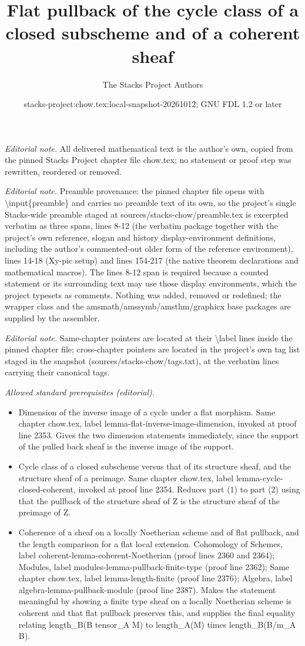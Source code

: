 \documentclass[10pt,a4paper]{amsart}
\title{Flat pullback of the cycle class of a closed subscheme and of a coherent sheaf}
\author{The Stacks Project Authors}
\date{stacks-project:chow.tex:local-snapshot-20261012; GNU FDL 1.2 or later}
\theoremstyle{plain}
\theoremstyle{definition}
\theoremstyle{remark}
\numberwithin{equation}{subsection}
\begin{document}
\maketitle
\noindent\textit{Editorial note.} All delivered mathematical text is the author's own, copied from the pinned Stacks Project chapter file chow.tex; no statement or proof step was rewritten, reordered or removed.\par\medskip
\noindent\textit{Editorial note.} Preamble provenance: the pinned chapter file opens with \textbackslash{}input\{preamble\} and carries no preamble text of its own, so the project's single Stacks-wide preamble staged at sources/stacks-chow/preamble.tex is excerpted verbatim as three spans, lines 8-12 (the verbatim package together with the project's own reference, slogan and history display-environment definitions, including the author's commented-out older form of the reference environment), lines 14-18 (Xy-pic setup) and lines 154-217 (the native theorem declarations and mathematical macros). The lines 8-12 span is required because a counted statement or its surrounding text may use those display environments, which the project typesets as comments. Nothing was added, removed or redefined; the wrapper class and the amsmath/amssymb/amsthm/graphicx base packages are supplied by the assembler.\par\medskip
\noindent\textit{Editorial note.} Same-chapter pointers are located at their \textbackslash{}label lines inside the pinned chapter file; cross-chapter pointers are located in the project's own tag list staged in the snapshot (sources/stacks-chow/tags.txt), at the verbatim lines carrying their canonical tags.\par\medskip
\noindent\textit{Allowed standard prerequisites (editorial).}\begin{itemize}
\item Dimension of the inverse image of a cycle under a flat morphism. Same chapter chow.tex, label lemma-flat-inverse-image-dimension, invoked at proof line 2353. Gives the two dimension statements immediately, since the support of the pulled back sheaf is the inverse image of the support.
\item Cycle class of a closed subscheme versus that of its structure sheaf, and the structure sheaf of a preimage. Same chapter chow.tex, label lemma-cycle-closed-coherent, invoked at proof line 2354. Reduces part (1) to part (2) using that the pullback of the structure sheaf of Z is the structure sheaf of the preimage of Z.
\item Coherence of a sheaf on a locally Noetherian scheme and of flat pullback, and the length comparison for a flat local extension. Cohomology of Schemes, label coherent-lemma-coherent-Noetherian (proof lines 2360 and 2364); Modules, label modules-lemma-pullback-finite-type (proof line 2362); Same chapter chow.tex, label lemma-length-finite (proof line 2376); Algebra, label algebra-lemma-pullback-module (proof line 2387). Makes the statement meaningful by showing a finite type sheaf on a locally Noetherian scheme is coherent and that flat pullback preserves this, and supplies the final equality relating length\_B(B tensor\_A M) to length\_A(M) times length\_B(B/m\_A B).
\end{itemize}\medskip
\end{document}
